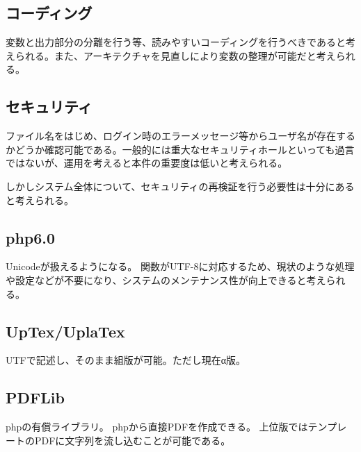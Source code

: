 \documentclass[titlepage]{jsarticle}
\begin{document}
\subsection{コーディング}
変数と出力部分の分離を行う等、読みやすいコーディングを行うべきであると考えられる。また、アーキテクチャを見直しにより変数の整理が可能だと考えられる。
\subsection{セキュリティ}
ファイル名をはじめ、ログイン時のエラーメッセージ等からユーザ名が存在するかどうか確認可能である。一般的には重大なセキュリティホールといっても過言ではないが、運用を考えると本件の重要度は低いと考えられる。

しかしシステム全体について、セキュリティの再検証を行う必要性は十分にあると考えられる。
\subsection{php6.0}
Unicodeが扱えるようになる。
関数がUTF-8に対応するため、現状のような処理や設定などが不要になり、システムのメンテナンス性が向上できると考えられる。
\subsection{UpTex/UplaTex}
UTFで記述し、そのまま組版が可能。ただし現在α版。

\subsection{PDFLib}
phpの有償ライブラリ。
phpから直接PDFを作成できる。
上位版ではテンプレートのPDFに文字列を流し込むことが可能である。
\end{document}
